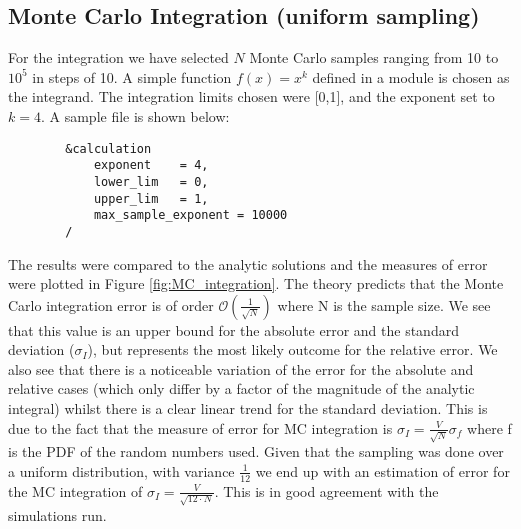 \subsection{Monte Carlo Integration (uniform sampling)}
\label{subection:uniform_sampling_integration}

For the integration we have selected $N$ Monte Carlo samples ranging from 10 to $10^5$ in steps of 10. A simple function $f(x) = x^k$ defined in a  module is chosen as the integrand. The integration limits chosen were [0,1], and the exponent set to $k = 4$. A sample  file is shown below:

    \begin{tcolorbox}[
        boxrule=0pt,
        sharp corners
    ]
        \begin{lstlisting}
        &calculation
            exponent    = 4,
            lower_lim   = 0,
            upper_lim   = 1,
            max_sample_exponent = 10000
        /
        \end{lstlisting}
    \end{tcolorbox}

    The results were compared to the analytic solutions and the measures of error were plotted in Figure \ref{fig:MC_integration}. The theory predicts that the Monte Carlo integration error is of order $\mathcal{O}(\frac{1}{\sqrt{N}})$ where N is the sample size. We see that this value is an upper bound for the absolute error and the standard deviation ($\sigma _I$), but represents the most likely outcome for the relative error. We also see that there is a noticeable variation of the error for the absolute and relative cases (which only differ by a factor of the magnitude of the analytic integral) whilst there is a clear linear trend for the standard deviation. This is due to the fact that the measure of error for MC integration is $\sigma _I = \frac{V}{\sqrt{N}}\sigma _f $ where f is the PDF of the random numbers used. Given that the sampling was done over a uniform distribution, with variance $\frac{1}{12}$ we end up with an estimation of error for the MC integration of $\sigma _I = \frac{V}{\sqrt{12\cdot N}}$. This is in good agreement with the simulations run.

